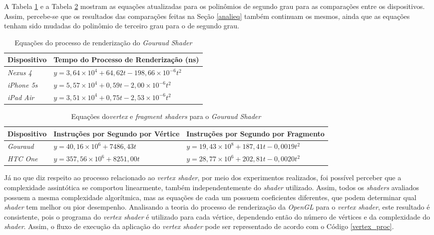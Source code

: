 	A Tabela \ref{render_time_compsec} e a Tabela \ref{vertex_frag_compsec} mostram as equações atualizadas para os polinômios de segundo grau para as comparações entre os dispositivos. Assim, percebe-se que os resultados das comparações feitas na Seção \ref{analieq} também continuam os mesmos, ainda que as equações tenham sido mudadas do polinômio de terceiro grau para o de segundo grau. 

	
	\begin{table}[ht]
	\centering	
	\begin{tabularx}{0.9\textwidth}{lX}
		\toprule
		\textbf{Dispositivo} & \textbf{Tempo do Processo de Renderização (ns)}  \\
		\midrule
		\textit{Nexus 4} &  $y = 3,64 \times 10^4 + 64,62t - 198,66 \times 10^{-6}t^2$\\
		\textit{iPhone 5s} &   $y = 5,57 \times 10^4 + 0,59t - 2,00 \times 10^{-6}t^2$\\
		\textit{iPad Air} & $y = 3,51 \times 10^4 + 0,75t - 2,53 \times 10^{-6}t^2$\\	
		\bottomrule
	\end{tabularx}
	\caption{Equações do processo de renderização do \textit{Gouraud Shader}}
	\label{render_time_compsec}
	\end{table}

	\begin{table}[ht]
	\centering	
	\begin{tabularx}{0.9\textwidth}{lXX}
		\toprule
		\textbf{Dispositivo} & \textbf{Instruções por Segundo por Vértice} & \textbf{Instruções por Segundo por Fragmento}  \\
		\midrule
		\textit{Gouraud} & $y = 40,16 \times 10^6 + 7486,43t$ &$y = 19,43 \times 10 ^8 + 187,41t - 0,0019t^2$  \\
		\textit{HTC One} & $y = 357,56 \times 10^6 + 8251,00t$ & $y = 28,77 \times 10 ^6+ 202,81t - 0,0020t^2$  \\

		\bottomrule
	\end{tabularx}
	\caption{Equações do\textit{vertex} e \textit{fragment shaders} para o \textit{Gouraud Shader}}
	\label{vertex_frag_compsec}
	\end{table}

	 Já no que diz respeito ao processo relacionado ao \textit{vertex shader}, por meio dos experimentos realizados, foi possível perceber que a complexidade assintótica se comportou linearmente, também independentemente do \textit{shader} utilizado. Assim, todos os \textit{shaders} avaliados possuem a mesma complexidade algorítmica, mas as equações de cada um possuem coeficientes diferentes, que podem determinar qual \textit{shader} tem melhor ou pior desempenho. Analisando a teoria do processo de renderização da \textit{OpenGL} para o \textit{vertex shader}, este resultado é consistente, pois o programa do \textit{vertex shader} é utilizado para cada vértice, dependendo então do número de vértices e da complexidade do \textit{shader}.  Assim, o fluxo de execução da aplicação do \textit{vertex shader} pode ser representado de acordo com o Código \ref{vertex_proc}.

